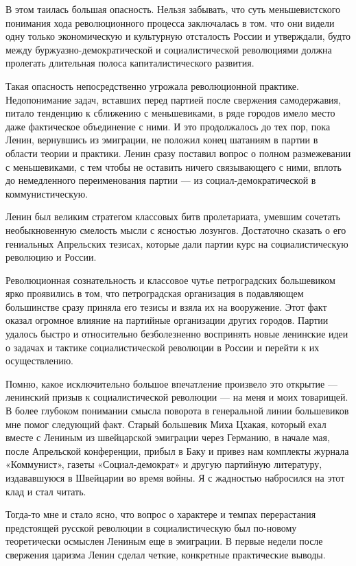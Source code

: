 \documentclass[12pt, a4paper, openany]{book}
\begin{document}
В этом таилась большая опасность. Нельзя забывать, что суть меньшевистского понимания хода революционного процесса заключалась в том. что они видели одну только экономическую и культурную отсталость России и утверждали, будто между буржуазно-демократической и социалистической революциями должна пролегать длительная полоса капиталистического развития.

Такая опасность непосредственно угрожала революционной практике. Недопонимание задач, вставших перед партией после свержения самодержавия, питало тенденцию к сближению с меньшевиками, в ряде городов имело место даже фактическое объединение с ними. И это продолжалось до тех пор, пока Ленин, вернувшись из эмиграции, не положил конец шатаниям в партии в области теории и практики. Ленин сразу поставил вопрос о полном размежевании с меньшевиками, с тем чтобы не оставить ничего связывающего с ними, вплоть до немедленного переименования партии — из социал-демократической в коммунистическую.

Ленин был великим стратегом классовых битв пролетариата, умевшим сочетать необыкновенную смелость мысли с ясностью лозунгов. Достаточно сказать о его гениальных Апрельских тезисах, которые дали партии курс на социалистическую революцию и России.

Революционная сознательность и классовое чутье петроградских большевиком ярко проявились в том, что петроградская организация в подавляющем большинстве сразу приняла его тезисы и взяла их на вооружение. Этот факт оказал огромное влияние на партийные организации других городов. Партии удалось быстро и относительно безболезненно воспринять новые ленинские идеи о задачах и тактике социалистической революции в России и перейти к их осуществлению.

Помню, какое исключительно большое впечатление произвело это открытие — ленинский призыв к социалистической революции — на меня и моих товарищей. В более глубоком понимании смысла поворота в генеральной линии большевиков мне помог следующий факт. Старый большевик Миха Цхакая, который ехал вместе с Лениным из швейцарской эмиграции через Германию, в начале мая, после Апрельской конференции, прибыл в Баку и привез нам комплекты журнала «Коммунист», газеты «Социал-демократ» и другую партийную литературу, издававшуюся в Швейцарии во время войны. Я с жадностью набросился на этот клад и стал читать.

Тогда-то мне и стало ясно, что вопрос о характере и темпах перерастания предстоящей русской революции в социалистическую был по-новому теоретически осмыслен Лениным еще в эмиграции. В первые недели после свержения царизма Ленин сделал четкие, конкретные практические выводы.
\end{document}
